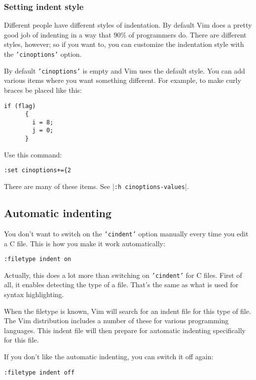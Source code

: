 \subsubsection{Setting indent style}
Different people have different styles of indentation.
By default Vim does a pretty good job of indenting in a way that 90\% of programmers do.
There are different styles, however; so if you want to, you can customize the indentation style with the \texttt{'cinoptions'} option.

By default \texttt{'cinoptions'} is empty and Vim uses the default style.
You can add various items where you want something different.
For example, to make curly braces be placed like this:

\begin{Verbatim}[samepage=true]
    if (flag) 
      { 
        i = 8; 
        j = 0; 
      } 
\end{Verbatim}

Use this command:

\begin{Verbatim}[samepage=true]
 :set cinoptions+={2
\end{Verbatim}

There are many of these items.  See |\texttt{:h cinoptions-values}|.
\subsection{Automatic indenting}
You don't want to switch on the \texttt{'cindent'} option manually every time you edit a C file.
This is how you make it work automatically:

\begin{Verbatim}[samepage=true]
 :filetype indent on
\end{Verbatim}

Actually, this does a lot more than switching on \texttt{'cindent'} for C files.
First of all, it enables detecting the type of a file.
That's the same as what is used for syntax highlighting.

When the filetype is known, Vim will search for an indent file for this type of file.
The Vim distribution includes a number of these for various programming languages.
This indent file will then prepare for automatic indenting specifically for this file.

If you don't like the automatic indenting, you can switch it off again:

\begin{Verbatim}[samepage=true]
 :filetype indent off
\end{Verbatim}

